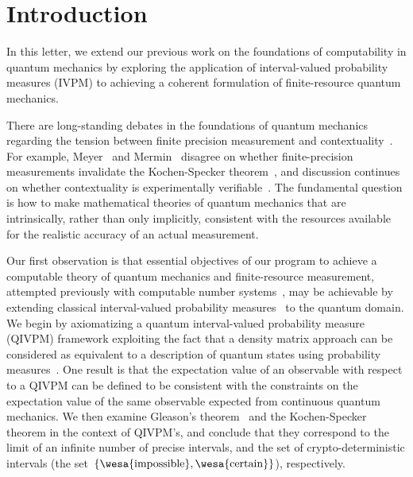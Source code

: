 \documentclass[english,reprint, aps, prl,superscriptaddress, showpacs,
showkeys, longbibliography, amsmath, amssymb]{revtex4-1}
\theoremstyle{plain}
\theoremstyle{definition}
\newcommand{\imposs}{{\text{\wesa{impossible}}}}
\newcommand{\necess}{{\text{\wesa{certain}}}}
\begin{document}
\maketitle

\section{Introduction}

In this letter, we extend our previous work on the foundations of
computability in quantum mechanics by exploring the application of
interval-valued probability measures (IVPM) to achieving a coherent
formulation of finite-resource quantum mechanics.

There are long-standing debates in the foundations of quantum
mechanics regarding the tension between finite precision measurement
and contextuality~\cite{Peres2003,BarrettKent2004}.  For example,
Meyer~\cite{PhysRevLett.83.3751} and Mermin~\cite{Mermin1999} disagree
on whether finite-precision measurements invalidate the Kochen-Specker
theorem~\cite{kochenspecker1967,peres1995quantum}, and discussion
continues on whether contextuality is experimentally
verifiable~\cite{Spekkens2005,GuehneKleinmannCabelloEtAl2010,MazurekPuseyKunjwalEtAl2016}. The
fundamental question is how to make mathematical theories of quantum
mechanics that are intrinsically, rather than only implicitly,
consistent with the resources available for the realistic accuracy of
an actual measurement.

Our first observation is that essential objectives of our program to
achieve a computable theory of quantum mechanics and finite-resource
measurement, attempted previously with computable number
systems~\cite{usat,geometry2013apsrev4,DQT2014}, may be achievable by
extending classical interval-valued probability
measures~\cite{JamisonLodwick2004} to the quantum domain.  We begin by
axiomatizing a quantum interval-valued probability measure (QIVPM)
framework exploiting the fact that a density matrix approach can be
considered as equivalent to a description of quantum states using
probability measures~\cite{10.2307/2308516,Varadarajan2008}. %
One result is that the expectation value of an observable with respect
to a QIVPM can be defined to be consistent with the constraints on the
expectation value of the same observable expected from continuous
quantum mechanics.  We then examine Gleason's
theorem~\cite{gleason1957,Redhead1987-REDINA,peres1995quantum} and the
Kochen-Specker theorem in the context of QIVPM's, and conclude that
they correspond to the limit of an infinite number of precise
intervals, and the set of crypto-deterministic intervals (the set~$\{\imposs,\necess\}$),
respectively.
\end{document}
